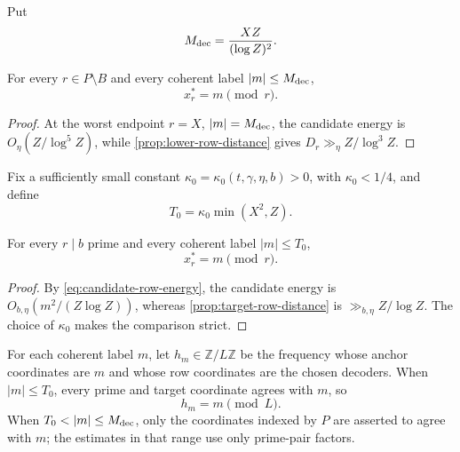 Put
\begin{equation}
\label{eq:M-dec}
 M_{\rm dec}=\frac{XZ}{(\log Z)^2}.
\end{equation}

\begin{proposition}
\label{prop:prime-decoder-identification}
For every $r\in P\setminus B$ and every coherent label $|m|\leq M_{\rm dec}$,
\[
 x_r^*=m\pmod r.
\]
\end{proposition}
\begin{proof}
At the worst endpoint $r=X$, $|m|=M_{\rm dec}$, the candidate energy is $O_\eta(Z/\log^5Z)$, while \cref{prop:lower-row-distance} gives $D_r\gg_\eta Z/\log^3Z$.
\end{proof}

Fix a sufficiently small constant $\kappa_0=\kappa_0(t,\gamma,\eta,b)>0$, with $\kappa_0<1/4$, and define
\begin{equation}
\label{eq:T-full}
 T_0=\kappa_0\min(X^2,Z).
\end{equation}

\begin{proposition}
\label{prop:target-decoder-identification}
For every $r\mid b$ prime and every coherent label $|m|\leq T_0$,
\[
 x_r^*=m\pmod r.
\]
\end{proposition}
\begin{proof}
By \cref{eq:candidate-row-energy}, the candidate energy is $O_{b,\eta}(m^2/(Z\log Z))$, whereas \cref{prop:target-row-distance} is $\gg_{b,\eta}Z/\log Z$. The choice of $\kappa_0$ makes the comparison strict.
\end{proof}

For each coherent label $m$, let $h_m\in\mathbb Z/L\mathbb Z$ be the frequency whose anchor coordinates are $m$ and whose row coordinates are the chosen decoders. When $|m|\leq T_0$, every prime and target coordinate agrees with $m$, so
\begin{equation}
\label{eq:h-m-full-identification}
 h_m=m\pmod L.
\end{equation}
When $T_0<|m|\leq M_{\rm dec}$, only the coordinates indexed by $P$ are asserted to agree with $m$; the estimates in that range use only prime-pair factors.
